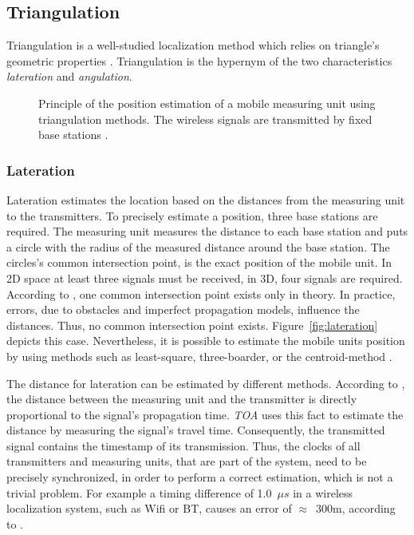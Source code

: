 \subsection{Triangulation}\label{sec:fund_trilateration}
Triangulation is a well-studied localization method which relies on triangle's geometric properties \citep{IEEE:survey_wireless_indoor_pos, wang:bt_pos}. Triangulation is the hypernym of the two characteristics \emph{lateration} and \emph{angulation}.

\begin{figure}[width=0.9\textwidth, height=0.4\textheight]
	
	\caption {Principle of the position estimation of a mobile measuring unit using triangulation methods. The wireless signals are transmitted by fixed base stations \citep{wang:bt_pos}.}
	\label{fig:triangulation}
\end{figure}

\subsubsection*{Lateration}
Lateration estimates the location based on the distances from the measuring unit to the transmitters. To precisely estimate a position, three base stations are required. The measuring unit measures the distance to each base station and puts a circle with the radius of the measured distance around the base station. The circles's common intersection point, is the exact position of the mobile unit. In 2D space at least three signals must be received, in 3D, four signals are required. According to \citet{wang:bt_pos}, one common intersection point exists only in theory. In practice, errors, due to obstacles and imperfect propagation models, influence the distances. Thus, no common intersection point exists. Figure~\ref{fig:lateration} depicts this case. Nevertheless, it is possible to estimate the mobile units position by using methods such as least-square, three-boarder, or the centroid-method \citep{wang:bt_pos, IEEE:survey_wireless_indoor_pos}.  

The distance for lateration can be estimated by different methods. According to \citet{IEEE:survey_wireless_indoor_pos}, the distance between the measuring unit and the transmitter is directly proportional to the signal's propagation time.
\emph{\ac{TOA}} uses this fact to estimate the distance by measuring the signal's travel time. Consequently, the transmitted signal contains the timestamp of its transmission. Thus, the clocks of all transmitters and measuring units, that are part of the system, need to be precisely synchronized, in order to perform a correct estimation, which is not a trivial problem. For example a timing difference of 1.0~$\mu s$ in a wireless localization system, such as Wifi or \ac{BT}, causes an error of $\approx$~300m, according to \citet{kotanen:exp_local_pos_bt}.

